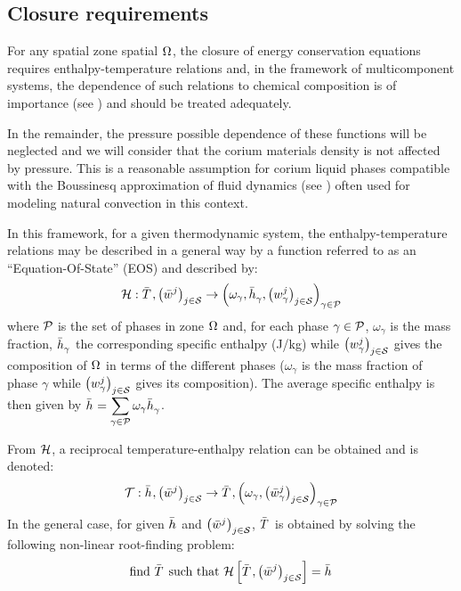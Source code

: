\subsection{Closure requirements} \label{sect:req}

For any spatial zone spatial $\Omega_{}$, the closure of energy conservation equations requires enthalpy-temperature relations and, in the framework of multicomponent systems, the dependence of such relations to chemical composition is of importance (see \cite{Schneider1991}) and should be treated adequately. 
\begin{remark}
In the remainder, the pressure possible dependence of these functions will be neglected and we will consider that the corium materials density is not affected by pressure. This is a reasonable assumption for corium liquid phases compatible with the Boussinesq approximation of fluid dynamics (see \cite{Hills1991}) often used for modeling natural convection in this context.
\end{remark}
In this framework, for a given thermodynamic system, the enthalpy-temperature relations may be described in a general way by a function referred to as an ``Equation-Of-State'' (EOS) and described by:
\begin{equation}
 \Mc{H}: \avTemperature{}, \left(\avMassFraction[j]{}\right)_{j\in \speciesSet} \rightarrow  \left(\omega_\gamma, \avMassEnthalpy{\gamma}, \left(\massFraction[j]{\gamma}\right)_{j\in \speciesSet}\right)_{\gamma \in \phaseSet} \label{eq:eos}
\end{equation}
where $\phaseSet$ is the set of phases in zone $\Omega_{}$ and, for each phase $\gamma \in \phaseSet$, $\omega_\gamma$ is the mass fraction, $\avMassEnthalpy{\gamma}$ the corresponding specific enthalpy (J/kg) while $\left(\massFraction[j]{\gamma}\right)_{j\in \speciesSet}$ gives the composition of $\Omega_{}$ in terms of the different phases ($\omega_\gamma$ is the mass fraction of phase $\gamma$ while $\left(\massFraction[j]{\gamma}\right)_{j\in \speciesSet}$ gives its composition). The average specific enthalpy is then given by $\avMassEnthalpy{} = \displaystyle \sum_{\gamma \in \phaseSet} \omega_\gamma \avMassEnthalpy{\gamma}$.

From ${\mathcal H}$, a reciprocal temperature-enthalpy relation can be obtained and is denoted:
\begin{equation}
\Mc{T}: \avMassEnthalpy{}, \left(\avMassFraction[j]{}\right)_{j\in \speciesSet} \rightarrow \avTemperature{}, \left(\omega_\gamma, \left(\avMassFraction[j]{\gamma}\right)_{j\in \speciesSet}\right)_{\gamma \in \phaseSet}
\end{equation}
In the general case, for given $\avMassEnthalpy{}$ and $\left(\avMassFraction[j]{}\right)_{j\in \speciesSet}$, $\avTemperature{}$ is obtained by solving the following non-linear root-finding problem: 
\begin{equation}
 \text{find } \avTemperature{} \text{ such that }\Mc{H}\left[\avTemperature{}, \left(\avMassFraction[j]{}\right)_{j\in \speciesSet}\right] = \avMassEnthalpy{} \label{eq:t(h)}
\end{equation}


